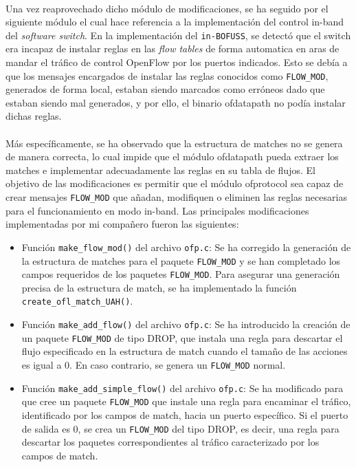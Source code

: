 \\
Una vez reaprovechado dicho módulo de modificaciones, se ha seguido por el siguiente módulo el cual hace referencia a la implementación del control in-band del \textit{software switch}. En la implementación del \texttt{in-BOFUSS}, se detectó que el switch era incapaz de instalar reglas en las \textit{flow tables} de forma automatica en aras de mandar el tráfico de control OpenFlow por los puertos indicados. Esto se debía a que los mensajes encargados de instalar las reglas conocidos como \texttt{FLOW\_MOD}, generados de forma local, estaban siendo marcados como erróneos dado que estaban siendo mal generados, y por ello, el binario ofdatapath no podía instalar dichas reglas.\\
\\
Más específicamente, se ha observado que la estructura de matches no se genera de manera correcta, lo cual impide que el módulo ofdatapath pueda extraer los matches e implementar adecuadamente las reglas en su tabla de flujos. El objetivo de las modificaciones es permitir que el módulo ofprotocol sea capaz de crear mensajes \texttt{FLOW\_MOD} que añadan, modifiquen o eliminen las reglas necesarias para el funcionamiento en modo in-band. Las principales modificaciones implementadas por mi compañero fueron las siguientes:

\begin{itemize}
    \item Función \texttt{make\_flow\_mod()} del archivo \texttt{ofp.c}: Se ha corregido la generación de la estructura de matches para el paquete \texttt{FLOW\_MOD} y se han completado los campos requeridos de los paquetes \texttt{FLOW\_MOD}. Para asegurar una generación precisa de la estructura de match, se ha implementado la función \texttt{create\_ofl\_match\_UAH()}.

    \item Función \texttt{make\_add\_flow()} del archivo \texttt{ofp.c}: Se ha introducido la creación de un paquete \texttt{FLOW\_MOD} de tipo DROP, que instala una regla para descartar el flujo especificado en la estructura de match cuando el tamaño de las acciones es igual a 0. En caso contrario, se genera un \texttt{FLOW\_MOD} normal.

    \item Función \texttt{make\_add\_simple\_flow()} del archivo \texttt{ofp.c}: Se ha modificado para que cree un paquete \texttt{FLOW\_MOD} que instale una regla para encaminar el tráfico, identificado por los campos de match, hacia un puerto específico. Si el puerto de salida es 0, se crea un \texttt{FLOW\_MOD} del tipo DROP, es decir, una regla para descartar los paquetes correspondientes al tráfico caracterizado por los campos de match.
\end{itemize}

